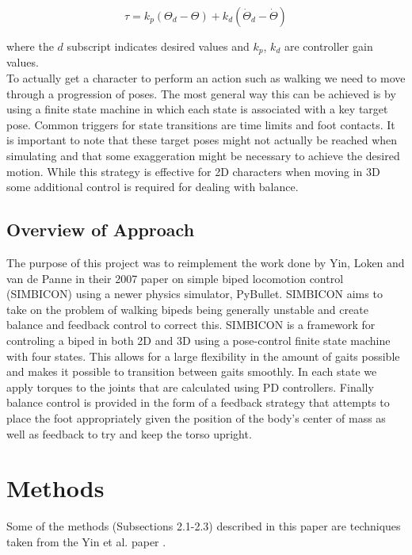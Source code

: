 \documentclass[12pt, a4paper]{article}
\begin{document}
\begin{equation}
\tau = k_p(\Theta_d - \Theta) + k_d(\dot\Theta_d -\dot\Theta)
\label{eqn: pd control}
\end{equation} 

where the $d$ subscript indicates desired values and $k_p$, $k_d$ are controller gain values.\\

To actually get a character to perform an action such as walking we need to move through a progression of poses. The most general way this can be achieved is by using a finite state machine in which each state is associated with a key target pose. Common triggers for state transitions are time limits and foot contacts. It is important to note that these target poses might not actually be reached when simulating and that some exaggeration might be necessary to achieve the desired motion. While this strategy is effective for 2D characters when moving in 3D some additional control is required for dealing with balance.  

\subsection{Overview of Approach}
The purpose of this project was to reimplement the work done by Yin, Loken and van de Panne in their 2007 paper \cite{Yin07} on simple biped locomotion control (SIMBICON) using a newer physics simulator, PyBullet. SIMBICON aims to take on the problem of walking bipeds being generally unstable and create balance and feedback control to correct this. SIMBICON is a framework for controling a biped in both 2D and 3D using a pose-control finite state machine with four states. This allows for a large flexibility in the amount of gaits possible and makes it possible to transition between gaits smoothly. In each state we apply torques to the joints that are calculated using PD controllers. Finally balance control is provided in the form of a feedback strategy that attempts to place the foot appropriately given the position of the body's center of mass as well as feedback to try and keep the torso upright.  

\section{Methods}
Some of the methods (Subsections 2.1-2.3) described in this paper are techniques taken from the Yin et al. paper \cite{Yin07}. 
\end{document}
